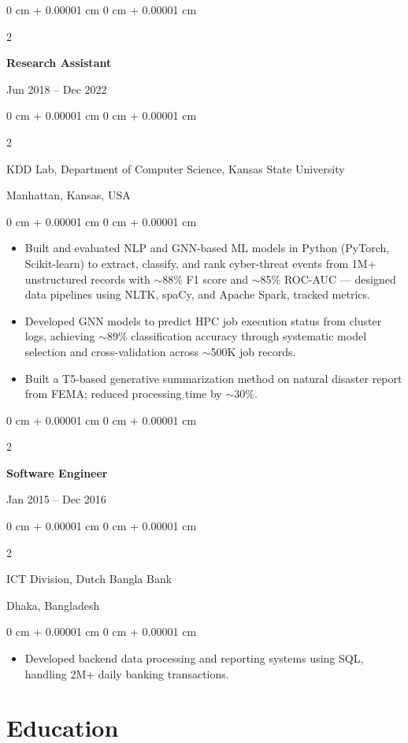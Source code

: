 \documentclass[10pt, letterpaper]{article}
\newenvironment{highlights}{
    \begin{itemize}[
        topsep=0.10 cm,
        parsep=0.10 cm,
        partopsep=0pt,
        itemsep=0pt,
        leftmargin=0 cm + 10pt
    ]
}{
    \end{itemize}
} %
\newenvironment{onecolentry}{
    \begin{adjustwidth}{
        0 cm + 0.00001 cm
    }{
        0 cm + 0.00001 cm
    }
}{
    \end{adjustwidth}
} %
\newenvironment{twocolentry}[2][]{
    \onecolentry
    \def\secondColumn{#2}
    \setcolumnwidth{\fill, 4.5 cm}
    \begin{paracol}{2}
}{
    \switchcolumn \raggedleft \secondColumn
    \end{paracol}
    \endonecolentry
} %
\begin{document}
    \vspace{1mm}

    \begin{twocolentry}{Jun 2018 -- Dec 2022}
        \textbf{Research Assistant}
    \end{twocolentry}
    \begin{twocolentry}{Manhattan, Kansas, USA}
       KDD Lab, Department of Computer Science, Kansas State University
    \end{twocolentry}
    \vspace{0.10 cm}
    \begin{onecolentry}
        \begin{highlights}
            \item Built and evaluated NLP and GNN-based ML models in Python (PyTorch, Scikit-learn) to extract, classify, and rank cyber-threat events from 1M+ unstructured records with $\sim$88\% F1 score and $\sim$85\% ROC-AUC — designed data pipelines using NLTK, spaCy, and Apache Spark, tracked metrics.
            \item Developed GNN models to predict HPC job execution status from cluster logs, achieving $\sim$89\% classification accuracy through systematic model selection and cross-validation across $\sim$500K job records.
            \item Built a T5-based generative summarization method on natural disaster report from FEMA; reduced processing time by $\sim$30\%.
        \end{highlights}
    \end{onecolentry}

    \vspace{0.1 cm}
    \begin{twocolentry}{Jan 2015 -- Dec 2016}
        \textbf{Software Engineer}
    \end{twocolentry}
    \begin{twocolentry}{Dhaka, Bangladesh}
       ICT Division, Dutch Bangla Bank
    \end{twocolentry}

    \begin{onecolentry}
        \begin{highlights}
            \item Developed backend data processing and reporting systems using SQL, handling 2M+ daily banking transactions.
        \end{highlights}
    \end{onecolentry}

\section{Education}
\end{document}
